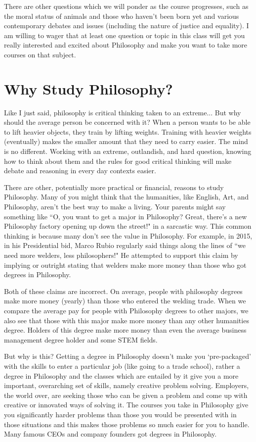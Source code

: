 There are other questions which we will ponder as the course progresses, such as the moral status of animals and those who haven't been born yet and various contemporary debates and issues (including the nature of justice and equality). I am willing to wager that at least one question or topic in this class will get you really interested and excited about Philosophy and make you want to take more courses on that subject. 
\section{Why Study Philosophy?}

Like I just said, philosophy is critical thinking taken to an extreme... But why should the average person be concerned with it? When a person wants to be able to lift heavier objects, they train by lifting weights. Training with heavier weights (eventually) makes the smaller amount that they need to carry easier. The mind is no different. Working with an extreme, outlandish, and hard question, knowing how to think about them and the rules for good critical thinking will make debate and reasoning in every day contexts easier.

There are other, potentially more practical or financial, reasons to study Philosophy. Many of you might think that the humanities, like English, Art, and Philosophy, aren't the best way to make a living. Your parents might say something like ``O, you want to get a major in Philosophy? Great, there's a new Philosophy factory opening up down the street!" in a sarcastic way. This common thinking is because many don't see the value in Philosophy. For example, in 2015, in his Presidential bid, Marco Rubio regularly said things along the lines of ``we need more welders, less philosophers!"\autocite{philervwelder2} He attempted to support this claim by implying or outright stating that welders make more money than those who got degrees in Philosophy.

Both of these claims are incorrect. On average, people with philosophy degrees make more money (yearly) than those who entered the welding trade.\autocite{weldersvphilers} When we compare the average pay for people with Philosophy degrees to other majors, we also see that those with this major make more money than any other humanities degree.\autocite{philermoney} Holders of this degree make more money than even the average business management degree holder and some STEM fields. 

But why is this? Getting a degree in Philosophy doesn't make you `pre-packaged' with the skills to enter a particular job (like going to a trade school), rather a degree in Philosophy and the classes which are entailed by it give you a more important, overarching set of skills, namely creative problem solving. Employers, the world over, are seeking those who can be given a problem and come up with creative or innovated ways of solving it. The courses you take in Philosophy give you significantly harder problems than those you would be presented with in those situations and this makes those problems so much easier for you to handle. Many famous CEOs and company founders got degrees in Philosophy. 
